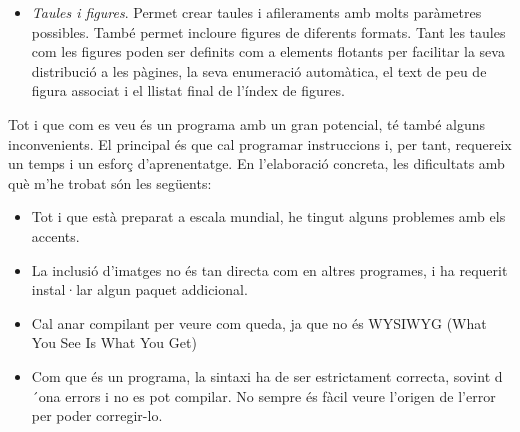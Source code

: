 \begin{refsection}
\begin{itemize}
	\item \textit{Taules i figures}. Permet crear taules i afileraments amb molts paràmetres possibles. També permet incloure figures de diferents formats. Tant les taules com les figures poden ser definits com a elements flotants per facilitar la seva distribució a les pàgines, la seva enumeració automàtica, el text de peu de figura associat i el llistat final de l'índex de figures.
\end{itemize}

Tot i que com es veu és un programa amb un gran potencial, té també alguns inconvenients. El principal és que cal programar instruccions i, per tant, requereix un temps i un esforç d’aprenentatge. En l’elaboració concreta, les dificultats amb què m’he trobat són les següents:

\begin{itemize}
	\item Tot i que està preparat a escala mundial, he tingut alguns problemes amb els accents.
	\item La inclusió d’imatges no és tan directa com en altres programes, i ha requerit instal·lar algun paquet addicional.
	\item Cal anar compilant per veure com queda, ja que no és WYSIWYG (What You See Is What You Get)
	\item Com que és un programa, la sintaxi ha de ser estrictament correcta, sovint d´ona errors i no es pot compilar. No sempre és fàcil veure l’origen de l’error per poder corregir-lo.
\end{itemize}

\printbibliography[heading=subbibintoc]

\end{refsection}